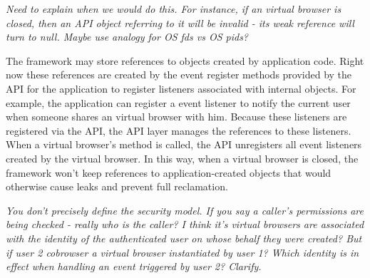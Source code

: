 \emph{Need to explain when we would do this. For instance, if an virtual browser
is closed, then an API object referring to it will be invalid - its weak reference
will turn to null. Maybe use analogy for OS fds vs OS pids?}

\apireferencefig{}

The framework may store references to objects created by application
code.  Right now these references are created by the event register methods
provided by the API for the application to register listeners associated with internal
objects. For example, the application can register a event listener to notify
the current user when someone shares an virtual browser with him.  Because these
listeners are registered via the API, the API layer manages the references to these
listeners. When a virtual browser's  method is called, the API
unregisters all event listeners created by the virtual browser. In this
way, when a virtual browser is closed, the framework won't keep references
to application-created objects that would otherwise cause leaks and prevent
full reclamation.

\emph{You don't precisely define the security model. If you say a caller's permissions
    are being checked - really who is the caller?  I think it's virtual browsers
    are associated with the identity of the authenticated user on whose behalf
    they were created?  But if user 2 cobrowser a virtual browser instantiated
    by user 1?  Which identity is in effect when handling an event triggered by
    user 2? Clarify.}

